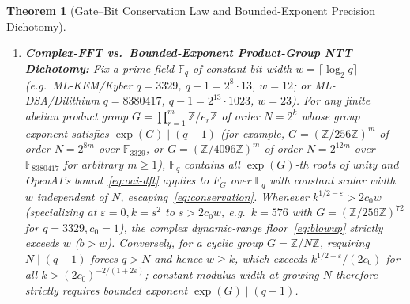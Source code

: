 \documentclass[11pt,a4paper]{article}
\newtheorem{theorem}{Theorem}[section]
\theoremstyle{definition}
\theoremstyle{remark}
\newcommand{\ZZ}{\mathbb{Z}}
\newcommand{\FF}{\mathbb{F}}
\begin{document}
\begin{theorem}[Gate--Bit Conservation Law and Bounded-Exponent Precision Dichotomy]
\begin{enumerate}[leftmargin=1.8em,itemsep=2pt]
  \item \textbf{Complex-FFT vs.\ Bounded-Exponent Product-Group NTT Dichotomy:} Fix a prime field $\FF_q$ of constant bit-width $w = \lceil \log_2 q \rceil$ (e.g.\ ML-KEM/Kyber $q = 3329$, $q-1 = 2^8 \cdot 13$, $w = 12$; or ML-DSA/Dilithium $q = 8380417$, $q-1 = 2^{13} \cdot 1023$, $w = 23$). For any finite abelian product group $G = \prod_{r=1}^m \ZZ / e_r \ZZ$ of order $N = 2^k$ whose group exponent satisfies $\exp(G) \mid (q-1)$ (for example, $G = (\ZZ/256\ZZ)^m$ of order $N = 2^{8m}$ over $\FF_{3329}$, or $G = (\ZZ/4096\ZZ)^m$ of order $N = 2^{12m}$ over $\FF_{8380417}$ for arbitrary $m \ge 1$), $\FF_q$ contains all $\exp(G)$-th roots of unity and OpenAI's bound~\eqref{eq:oai-dft} applies to $F_G$ over $\FF_q$ with constant scalar width $w$ independent of $N$, escaping~\eqref{eq:conservation}. Whenever $k^{1/2-\varepsilon} > 2 c_0 w$ (specializing at $\varepsilon = 0, k = s^2$ to $s > 2 c_0 w$, e.g.\ $k = 576$ with $G = (\ZZ/256\ZZ)^{72}$ for $q=3329, c_0=1$), the complex dynamic-range floor~\eqref{eq:blowup} strictly exceeds $w$ ($b > w$). Conversely, for a \emph{cyclic} group $G = \ZZ/N\ZZ$, requiring $N \mid (q-1)$ forces $q > N$ and hence $w \ge k$, which exceeds $k^{1/2-\varepsilon}/(2c_0)$ for all $k > (2c_0)^{-2/(1+2\varepsilon)}$; constant modulus width at growing $N$ therefore strictly requires bounded exponent $\exp(G) \mid (q-1)$.
\end{enumerate}
\end{theorem}
\end{document}
